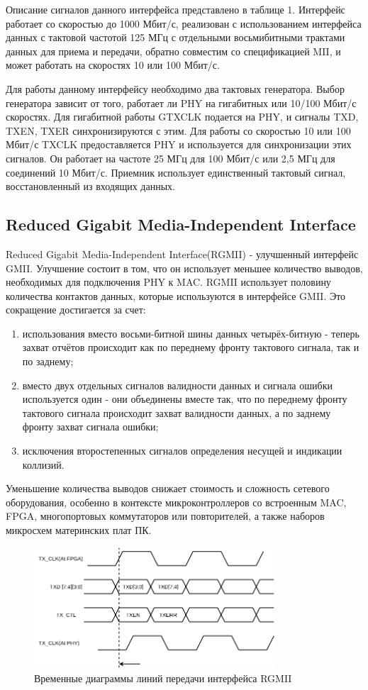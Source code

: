 Описание сигналов данного интерфейса представлено в таблице 1. Интерфейс работает со скоростью до 1000 Мбит/с, реализован с использованием интерфейса данных с тактовой частотой 125 МГц с отдельными восьмибитными трактами данных для приема и передачи, обратно совместим со спецификацией MII, и может работать на скоростях 10 или 100 Мбит/с. 

Для работы данному интерфейсу необходимо два тактовых генератора. Выбор генератора зависит от того, работает ли PHY на гигабитных или 10/100 Мбит/с скоростях. Для гигабитной работы GTXCLK подается на PHY, и сигналы TXD, TXEN, TXER синхронизируются с этим. Для работы со скоростью 10 или 100 Мбит/с TXCLK предоставляется PHY и используется для синхронизации этих сигналов. Он работает на частоте 25 МГц для 100 Мбит/с или 2,5 МГц для соединений 10 Мбит/с. Приемник использует единственный тактовый сигнал, восстановленный из входящих данных. 

\subsection{Reduced Gigabit Media-Independent Interface}
Reduced Gigabit Media-Independent Interface(RGMII) - улучшенный интерфейс GMII. Улучшение состоит в том, что он использует меньшее количество выводов, необходимых для подключения PHY к MAC.
RGMII использует половину количества контактов данных, которые используются в интерфейсе GMII. Это сокращение достигается за счет:
\begin{enumerate}
	\item использования вместо восьми-битной шины данных четырёх-битную - теперь захват отчётов происходит как по переднему фронту тактового сигнала, так и по заднему;
	\item вместо двух отдельных сигналов валидности данных и сигнала ошибки используется один - они объединены вместе так, что по переднему фронту тактового сигнала происходит захват валидности данных, а по заднему фронту захват сигнала ошибки;
	\item исключения второстепенных сигналов определения несущей и индикации коллизий.
\end{enumerate} 

Уменьшение количества выводов снижает стоимость и сложность сетевого оборудования, особенно в контексте микроконтроллеров со встроенным MAC, FPGA, многопортовых коммутаторов или повторителей, а также наборов микросхем материнских плат ПК. 

\begin{figure}[!ht]
	\centering
	\includegraphics[width=0.8\textwidth]{image/TX_RGMII}
	\caption{Временные диаграммы линий передачи интерфейса RGMII}
	\label{TX_RGMII}
\end{figure}

